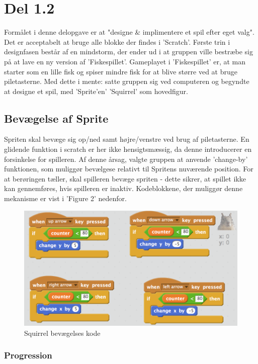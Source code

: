 \documentclass[11pt,a4paper,final]{article}
\begin{document}
\section*{Del 1.2}
Formålet i denne delopgave er at "designe \& implimentere et spil efter eget valg". Det er acceptabelt at bruge alle blokke der findes i 'Scratch'. \linebreak
\linebreak
Første trin i designfasen består af en mindstorm, der ender ud i at gruppen ville bestræbe sig på at lave en ny version af 'Fiskespillet'. Gameplayet i 'Fiskespillet' er, at man starter som en lille fisk og spiser mindre fisk for at blive større ved at bruge piletasterne. 
Med dette i mente: satte gruppen sig ved computeren og begyndte at designe et spil, med 'Sprite'en' 'Squirrel' som hovedfigur. 

\subsection*{Bevægelse af Sprite}
Spriten skal bevæge sig op/ned samt højre/venstre ved brug af piletasterne. En glidende funktion i scratch er her ikke hensigtsmæssig, da denne introducerer en forsinkelse for spilleren. Af denne årsag, valgte gruppen at anvende 'change-by' funktionen, som muliggør bevælgese relativt til Spritens nuværende position. For at berøringen tæller, skal spilleren bevæge spriten - dette sikrer, at spillet ikke kan gennemføres, hvis spilleren er inaktiv.  Kodeblokkene, der muliggør denne mekanisme er vist i 'Figure 2' nedenfor.

\begin{figure}[H]
\centering
\includegraphics[scale = 0.4]{MovementSquirrel.png}
\caption{Squirrel bevægelses kode}
\end{figure}

\subsubsection*{Progression}
\end{document}
